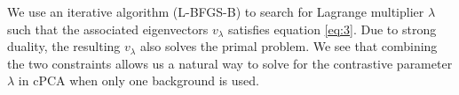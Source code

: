 \documentclass[12pt]{article}
\begin{document}
We use an iterative algorithm (L-BFGS-B) \cite{byrd1995limited} to search for Lagrange multiplier $\lambda$ such that the associated eigenvectors $v_\lambda$ satisfies equation \ref{eq:3}.
Due to strong duality, the resulting $v_\lambda$ also solves the primal problem.
We see that combining the two constraints allows us a natural way to solve for the contrastive parameter $\lambda$ in cPCA when only one background is used.


\end{document}
